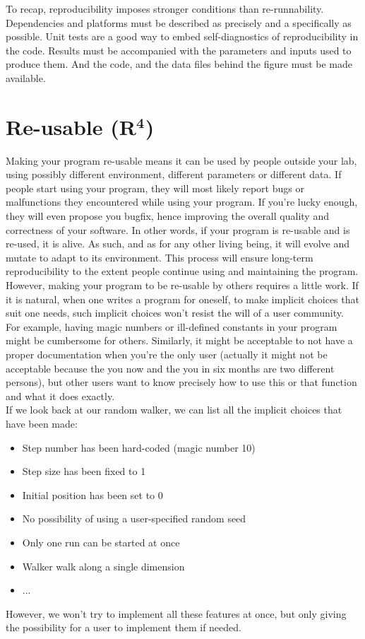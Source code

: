\documentclass[a4paper,11pt]{article}
\begin{document}
To recap, reproducibility imposes stronger conditions than re-runnability. Dependencies and platforms must be described as precisely and a specifically as possible. Unit tests are a good way to embed self-diagnostics of reproducibility in the code. Results must be accompanied with the parameters and inputs used to produce them. And the code, and the data files behind the figure must be made available. 


\section*{Re-usable (R$^{\mathbf 4}$)}

Making your program re-usable means it can be used by people outside your lab,
using possibly different environment, different parameters or different data.
If people start using your program, they will most likely report bugs or malfunctions they encountered while using your program.
If you're lucky enough, they will even propose you bugfix, hence improving the overall quality and correctness of your software.
In other words, if your program is re-usable and is re-used, it is alive.
As such, and as for any other living being, it will evolve and mutate to adapt to its environment.
This process will ensure long-term reproducibility to the extent people continue using and maintaining the program.\\

However, making your program to be re-usable by others requires a little work. If it is natural, when one writes a program for oneself, to make implicit choices that suit one needs, such implicit choices won't resist the will of a user community. For example, having magic numbers or ill-defined constants in your program might be cumbersome for others. Similarly, it might be acceptable to not have a proper documentation when you're the only user (actually it might not be acceptable because the you now and the you in six months are two different persons), but other users want to know precisely how to use this or that function and what it does exactly.\\


If we look back at our random walker, we can list all the implicit choices that have been made:
\begin{itemize}
\item Step number has been hard-coded (magic number 10)
\item Step size has been fixed to 1
\item Initial position has been set to 0
\item No possibility of using a user-specified random seed
\item Only one run can be started at once
\item Walker walk along a single dimension
\item ...
\end{itemize}
However, we won't try to implement all these features at once, but only giving the possibility for a user to implement them if needed.
\end{document}
